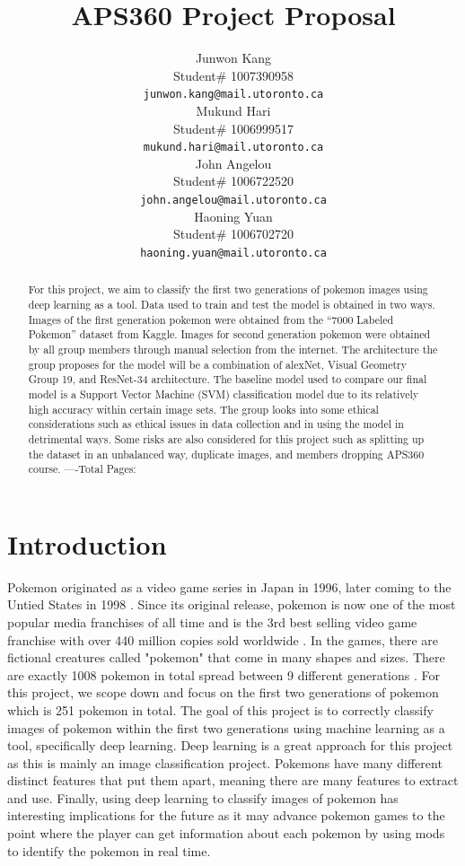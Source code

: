 \documentclass{article} %
\title{APS360 Project Proposal}
\author{Junwon Kang  \\
Student\# 1007390958\\
\texttt{junwon.kang@mail.utoronto.ca} \\
\And
Mukund Hari \\
Student\# 1006999517 \\
\texttt{mukund.hari@mail.utoronto.ca} \\
\AND
John Angelou  \\
Student\# 1006722520 \\
\texttt{john.angelou@mail.utoronto.ca} \\
\And
Haoning Yuan \\
Student\# 1006702720 \\
\texttt{haoning.yuan@mail.utoronto.ca} \\
\AND
}
\begin{document}
\maketitle

\begin{abstract}
For this project, we aim to classify the first two generations of pokemon images using deep learning as a tool. Data used to train and test the model is obtained in two ways. Images of the first generation pokemon were obtained from the “7000 Labeled Pokemon” dataset from Kaggle.  Images for second generation pokemon were obtained by all group members through manual selection from the internet. The architecture the group proposes for the model will be a combination of alexNet, Visual Geometry Group 19, and ResNet-34 architecture. The baseline model used to compare our final model is a Support Vector Machine (SVM) classification model due to its relatively high accuracy within certain image sets. The group looks into some ethical considerations such as ethical issues in data collection and in using the model in detrimental ways. Some risks are also considered for this project such as splitting up the dataset in an unbalanced way, duplicate images, and members dropping APS360 course. 
----Total Pages: \pageref{last_page}
\end{abstract}

\section{Introduction}

Pokemon originated as a video game series in Japan in 1996, later coming to the Untied States in 1998 \citep{Britannica}. Since its original release, pokemon is now one of the most popular media franchises of all time and is the 3rd best selling video game franchise with over 440 million copies sold worldwide \citep{PokemonCompany}. In the games, there are fictional creatures called "pokemon" that come in many shapes and sizes. There are exactly 1008 pokemon in total spread between 9 different generations \citep{PokemonNum}. For this project, we scope down and focus on the first two generations of pokemon which is 251 pokemon in total. The goal of this project is to correctly classify images of pokemon within the first two generations using machine learning as a tool, specifically deep learning. Deep learning is a great approach for this project as this is mainly an image classification project. Pokemons have many different distinct features that put them apart, meaning there are many features to extract and use. Finally, using deep learning to classify images of pokemon has interesting implications for the future as it may advance pokemon games to the point where the player can get information about each pokemon by using mods to identify the pokemon in real time.
\end{document}
